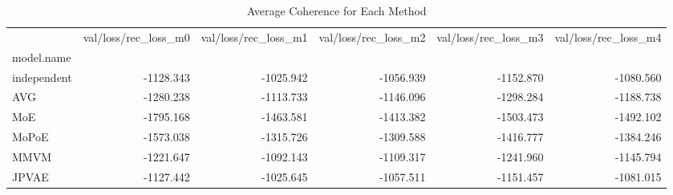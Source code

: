 \begin{table}
\caption{Average Coherence for Each Method}
\label{tab:average_coherence}
\begin{tabular}{lrrrrr}
\toprule
 & val/loss/rec_loss_m0 & val/loss/rec_loss_m1 & val/loss/rec_loss_m2 & val/loss/rec_loss_m3 & val/loss/rec_loss_m4 \\
model.name &  &  &  &  &  \\
\midrule
independent & -1128.343 & -1025.942 & -1056.939 & -1152.870 & -1080.560 \\
AVG & -1280.238 & -1113.733 & -1146.096 & -1298.284 & -1188.738 \\
MoE & -1795.168 & -1463.581 & -1413.382 & -1503.473 & -1492.102 \\
MoPoE & -1573.038 & -1315.726 & -1309.588 & -1416.777 & -1384.246 \\
MMVM & -1221.647 & -1092.143 & -1109.317 & -1241.960 & -1145.794 \\
JPVAE & -1127.442 & -1025.645 & -1057.511 & -1151.457 & -1081.015 \\
\bottomrule
\end{tabular}
\end{table}
